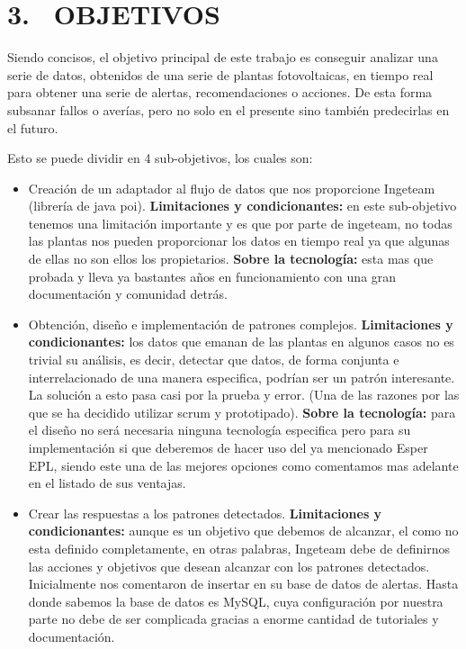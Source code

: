 \documentclass[a4paper]{article}
\begin{document}
\section{3. \ OBJETIVOS}
Siendo concisos, el objetivo principal de este trabajo es conseguir analizar una serie de datos, obtenidos de una serie de plantas fotovoltaicas, en tiempo real para obtener una serie de alertas, recomendaciones o acciones. De esta forma subsanar fallos o averías, pero no solo en el presente sino también predecirlas en el futuro.

Esto se puede dividir en 4 sub-objetivos, los cuales son:

\begin{itemize}
	\item Creación de un adaptador al flujo de datos que nos proporcione Ingeteam (librería de java poi). \newline
    \textbf{Limitaciones y condicionantes:} en este sub-objetivo tenemos una limitación importante y es que por parte de ingeteam, no todas las plantas nos pueden proporcionar los datos en tiempo real ya que algunas de ellas no son ellos los propietarios.\newline 
    \textbf{Sobre la tecnología:} esta mas que probada y lleva ya bastantes años en funcionamiento con una gran documentación y comunidad detrás.
    
    \item Obtención, diseño e implementación de patrones complejos. \newline
    \textbf{Limitaciones y condicionantes:} los datos que emanan de las plantas en algunos casos no es trivial su análisis, es decir, detectar que datos, de forma conjunta e interrelacionado de una manera especifica, podrían ser un patrón interesante. La solución a esto pasa casi por la prueba y error. (Una de las razones por las que se ha decidido utilizar scrum y prototipado). \newline
    \textbf{Sobre la tecnología:} para el diseño no será necesaria ninguna tecnología especifica pero para su implementación si que deberemos de hacer uso del ya mencionado Esper EPL, siendo este una de las mejores opciones como comentamos mas adelante en el listado de sus ventajas. \newline
    
    \item Crear las respuestas a los patrones detectados. \newline
    \textbf{Limitaciones y condicionantes:} aunque es un objetivo que debemos de alcanzar, el como no esta definido completamente, en otras palabras, Ingeteam debe de definirnos las acciones y objetivos que desean alcanzar con los patrones detectados. Inicialmente nos comentaron de insertar en su base de datos de alertas. Hasta donde sabemos la base de datos es MySQL, cuya configuración por nuestra parte no debe de ser complicada gracias a enorme cantidad de tutoriales y documentación.\newline
    

\end{itemize}
\end{document}
